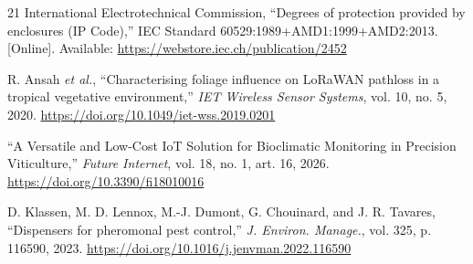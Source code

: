 \documentclass[conference]{IEEEtran}
\begin{document}
\begin{thebibliography}{21}
 International Electrotechnical Commission, ``Degrees of protection provided by enclosures (IP Code),'' IEC Standard 60529:1989+AMD1:1999+AMD2:2013. [Online]. Available: \url{https://webstore.iec.ch/publication/2452}

 R. Ansah \textit{et al.}, ``Characterising foliage influence on LoRaWAN pathloss in a tropical vegetative environment,'' \textit{IET Wireless Sensor Systems}, vol. 10, no. 5, 2020. \url{https://doi.org/10.1049/iet-wss.2019.0201} %

 ``A Versatile and Low-Cost IoT Solution for Bioclimatic Monitoring in Precision Viticulture,'' \textit{Future Internet}, vol. 18, no. 1, art. 16, 2026. \url{https://doi.org/10.3390/fi18010016} %

 D. Klassen, M. D. Lennox, M.-J. Dumont, G. Chouinard, and J. R. Tavares, ``Dispensers for pheromonal pest control,'' \textit{J. Environ. Manage.}, vol. 325, p. 116590, 2023. \url{https://doi.org/10.1016/j.jenvman.2022.116590}

\end{thebibliography}
\end{document}
